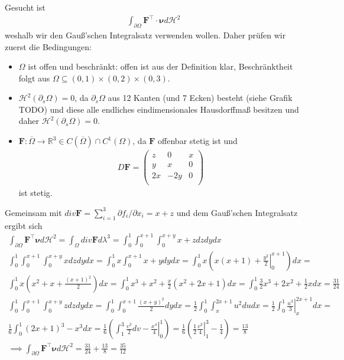 \documentclass[]{article}
\begin{document}
Gesucht ist
\begin{align*}
	\int_{\partial \Omega} \bm{F}^\top \cdot \bm{\nu} d\mathcal{H}^2
\end{align*}
weshalb wir den Gauß'schen Integralsatz verwenden wollen. Daher prüfen wir zuerst die Bedingungen:
\begin{itemize}
	\item $\Omega$ ist offen und beschränkt: offen ist aus der Definition klar, Beschränktheit folgt aus $\Omega \subseteq (0,1)\times(0,2)\times(0,3)$.
	\item $\mathcal{H}^2(\partial_s\Omega) = 0$, da $\partial_s\Omega$ aus 12 Kanten (und 7 Ecken) besteht (siehe Grafik TODO) und diese alle endliches eindimensionales Hausdorffmaß besitzen und daher $\mathcal{H}^2(\partial_s\Omega) = 0$.
	\item $\bm{F}:\overline{\Omega} \rightarrow \mathbb{R}^3 \in C(\overline{\Omega}) \cap C^1(\Omega)$, da $\bm{F}$ offenbar stetig ist und
	\begin{align*}
		D\bm{F} = \begin{pmatrix}
			z & 0 & x\\ y & x & 0\\ 2x & -2y & 0\\
		\end{pmatrix}
	\end{align*}
	ist stetig.
\end{itemize}

Gemeinsam mit $div\bm{F} = \sum_{i=1}^{3} \partial f_i / \partial x_i = x+z$ und dem Gauß'schen Integralsatz ergibt sich
\begin{align*}
	\int_{\partial\Omega} \bm{F}^\top \bm{\nu} d\mathcal{H}^2 = \int_\Omega div\bm{F} d\lambda^3 = \int_0^1 \int_0^{x+1} \int_0^{x+y} x+z dzdydx\\
	\int_0^1 \int_0^{x+1} \int_0^{x+y} x dzdydx = \int_0^1 x \int_0^{x+1} x+y dy dx = \int_0^1 x\left(x(x+1) + \left.\frac{y^2}{2}\right\vert_0^{x+1}\right) dx =\\
	\int_0^1 x \left(x^2+x + \frac{(x+1)^2}{2}\right) dx = \int_0^1 x^3 + x^2 + \frac{x}{2} (x^2+2x+1) dx = \int_0^1 \frac{3}{2} x^3 + 2 x^2 + \frac{1}{2} x dx = \frac{31}{24}\\
	\int_0^1 \int_0^{x+1} \int_0^{x+y} z dzdydx = \int_0^1 \int_0^{x+1} \frac{(x+y)^2}{2} dy dx = \frac{1}{2} \int_0^1 \int_x^{2x+1} u^2 du dx = \frac{1}{2} \int_0^1 \left.\frac{u^3}{3}\right\vert_x^{2x+1} dx =\\
	\frac{1}{6} \int_0^1 (2x+1)^3 - x^3 dx = \frac{1}{6} \left(\int_1^3 \frac{v^3}{2} dv - \left. \frac{x^4}{4}\right\vert_0^1\right) = \frac{1}{6} \left(\frac{1}{2} \left.\frac{v^3}{4}\right\vert_1^3 - \frac{1}{4}\right) = \frac{13}{8}\\
	\implies \int_{\partial\Omega} \bm{F}^\top \bm{\nu} d\mathcal{H}^2 = \frac{31}{24} + \frac{13}{8} = \frac{35}{12}
\end{align*}
\end{document}
